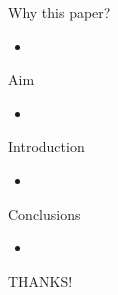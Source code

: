 \documentclass[aspectratio=169]{beamer}
\author{\authorlabel}
\newcommand{\mysubtitle}{\color{Pink}\Large{\textbf{}}}
\begin{document}



\begin{frame}
  \centering
  \mysubtitle%
\end{frame}

\begin{frame}{Why this paper?}
  \centering
  \begin{itemize}
    \item 
  \end{itemize}
\end{frame}

\begin{frame}{Aim}
  \centering
  \begin{itemize}
    \item 
  \end{itemize}
\end{frame}

\begin{frame}{Introduction}
  \begin{minipage}{0.5\textwidth}
    \color{Pink} 
    \begin{itemize}
      \item 
    \end{itemize}
  \end{minipage}%
  \begin{minipage}{0.5\textwidth}
  \end{minipage}
\end{frame}


\begin{frame}{Conclusions}
  \centering
  \begin{itemize}
    \item 
  \end{itemize}
\end{frame}

\begin{frame}
    \color{Pink} 
    \centering
     THANKS!
\end{frame}
\end{document}
